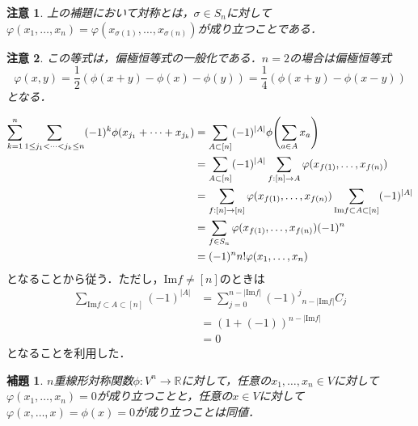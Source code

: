 \documentclass{ltjsarticle}
\makeatletter
\theoremstyle{mystyle1}
\newtheorem{lem}[dfn]{補題}
\theoremstyle{mystyle2}
\newtheorem{note*}{注意}
\theoremstyle{mystyle3}
\renewenvironment{proof}[1][\proofname]{\par
  \pushQED{\qed}%
  \normalfont
  \topsep6\p@\@plus6\p@ \trivlist
  \item[\hskip\labelsep{\bfseries\sffamily #1}]\ignorespaces
}{%
  \popQED\endtrivlist\@endpefalse
}
\renewcommand\proofname{証明}
\makeatother
\begin{document}
\begin{note*}
    上の補題において対称とは，$\sigma\in S_n$に対して$\varphi(x_1,\ldots,x_n)=\varphi(x_{\sigma(1)},\ldots,x_{\sigma(n)})$が成り立つことである．
\end{note*}

\begin{note*}
    この等式は，偏極恒等式の一般化である．$n=2$の場合は偏極恒等式
    \begin{equation}
        \varphi(x,y)=\frac{1}{2}(\phi(x+y)-\phi(x)-\phi(y))=\frac{1}{4}(\phi(x+y)-\phi(x-y))
    \end{equation}
    となる．
\end{note*}

\begin{proof}
    \begin{equation}
        \begin{split}
            \sum_{k=1}^n\sum_{1\leq j_1<\cdots<j_k\leq n}(-1)^k\phi(x_{j_1}+\cdots+x_{j_k})
            &=\sum_{A\subset[n]}(-1)^{|A|}\phi\mleft(\sum_{a\in A}x_a\mright)\\
            &=\sum_{A\subset [n]}(-1)^{|A|}\sum_{f:[n]\to A}\varphi(x_{f(1)},\ldots,x_{f(n)}) \\
            &=\sum_{f:[n]\to[n]}\varphi(x_{f(1)},\ldots,x_{f(n)})\sum_{\mathrm{Im}f\subset A\subset [n]}(-1)^{|A|} \\
            &=\sum_{f\in S_n}\varphi(x_{f(1)},\ldots,x_{f(n)})(-1)^n \\
            &=(-1)^nn!\varphi(x_1,\ldots,x_n)
        \end{split}
    \end{equation}
    となることから従う．ただし，$\mathrm{Im}f\neq [n]$のときは
    \begin{equation}
        \begin{split}
            \sum_{\mathrm{Im}f\subset A\subset [n]}(-1)^{|A|}
            &=\sum_{j=0}^{n-|\mathrm{Im}f|}(-1)^j{}_{n-|\mathrm{Im}f|}C_j \\
            &=(1+(-1))^{n-|\mathrm{Im}f|} \\
            &=0
        \end{split}
    \end{equation}
    となることを利用した．
\end{proof}

\begin{lem}
    $n$重線形対称関数$\phi:V^n\to\mathbb{R}$に対して，任意の$x_1,\ldots,x_n\in V$に対して$\varphi(x_1,\ldots,x_n)=0$が成り立つことと，任意の$x\in V$に対して$\varphi(x,\ldots,x)=\phi(x)=0$が成り立つことは同値．
\end{lem}
\end{document}
